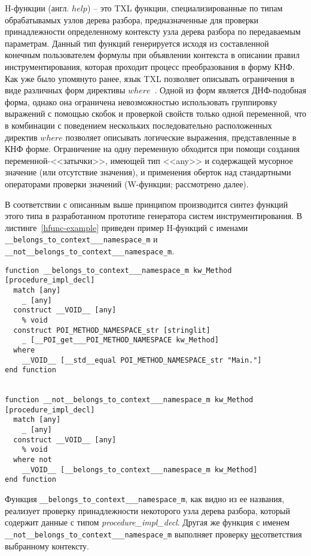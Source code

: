 H-функции (англ. $help$) -- это TXL функции, специализированные по типам обрабатывамых узлов дерева разбора, предназначенные для проверки принадлежности определенному контексту узла дерева разбора по передаваемым параметрам.
Данный тип функций генерируется исходя из составленной конечным пользователем формулы при объявлении контекста в описании правил инструментирования, которая проходит процесс преобразования в форму КНФ.
Как уже было упомянуто ранее, язык TXL позволяет описывать ограничения в виде различных форм директивы $where$~\cite{txl-book}.
Одной из форм является ДНФ-подобная форма, однако она ограничена невозможностью использовать группировку выражений с помощью скобок и проверкой свойств только одной переменной, что в комбинации с поведением нескольких последовательно расположенных директив $where$ позволяет описывать логические выражения, представленные в КНФ форме.
Ограничение на одну переменную обходится при помощи создания переменной-<<затычки>>, имеющей тип <<any>> и содержащей мусорное значение (или отсутствие значения), и применения оберток над стандартными операторами проверки значений (W-функции; рассмотрено далее).

В соответствии с описанным выше принципом производится синтез функций этого типа в разработанном прототипе генератора систем инструментирования.
В листинге~\ref{hfunc-example} приведен пример H-функций с именами \lstinline{__belongs_to_context___namespace_m} и \lstinline{__not__belongs_to_context___namespace_m}.

\begin{lstlisting}[frame=single, language=TXL, label={hfunc-example}, caption={Пример синтезированной H-функций.}]
function __belongs_to_context___namespace_m kw_Method [procedure_impl_decl]
  match [any]
    _ [any]
  construct __VOID__ [any]
    % void
  construct POI_METHOD_NAMESPACE_str [stringlit]
    _ [__POI_get___POI_METHOD_NAMESPACE kw_Method]
  where
    __VOID__ [__std__equal POI_METHOD_NAMESPACE_str "Main."]
end function


function __not__belongs_to_context___namespace_m kw_Method [procedure_impl_decl]
  match [any]
    _ [any]
  construct __VOID__ [any]
    % void
  where not
    __VOID__ [__belongs_to_context___namespace_m kw_Method]
end function
\end{lstlisting}

Функция \lstinline{__belongs_to_context___namespace_m}, как видно из ее названия, реализует проверку принадлежности некоторого узла дерева разбора, который содержит данные с типом \textit{procedure\_impl\_decl}.
Другая же функция с именем \lstinline{__not__belongs_to_context___namespace_m} выполняет проверку \underline{не}сответствия выбранному контексту.

